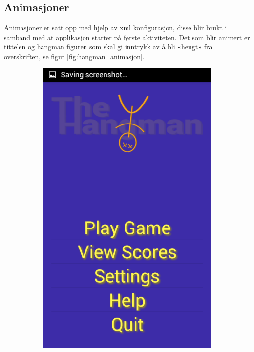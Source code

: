 \subsection{Animasjoner} \label{sub:animasjoner}
Animasjoner er satt opp med hjelp av xml konfigurasjon, disse blir brukt i samband med at applikasjon starter på første aktiviteten. Det som blir animert er tittelen og hangman figuren som skal gi inntrykk av å bli «hengt» fra overskriften, se figur \ref{fig:hangman_animasjon}.


\begin{figure}[ht]
    \centering
   \begin{subfigure}[b]{0.25\textwidth}
        \includegraphics[width=\textwidth]{./img/gui/a1.png}

\end{subfigure}
\end{figure}
